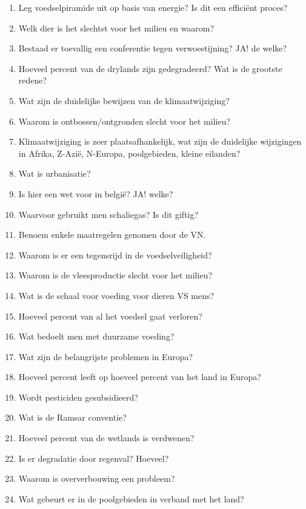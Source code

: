 \documentclass[a4paper,12pt]{article}
\begin{document}
\begin{enumerate}
        \item Leg voedselpiramide uit op basis van energie? Is dit een efficiënt proces?
        \item Welk dier is het slechtst voor het milieu en waarom?
        \item Bestaad er toevallig een conferentie tegen verwoestijning? JA! de welke?
        \item Hoeveel percent van de drylands zijn gedegradeerd? Wat is de grootste redene?
        \item Wat zijn de duidelijke bewijzen van de klimaatwijziging?
        \item Waarom is ontbossen/ontgronden slecht voor het milieu?
        \item Klimaatwijziging is zeer plaatsafhankelijk, wat zijn de duidelijke wijzigingen in Afrika, Z-Azië, N-Europa, poolgebieden, kleine eilanden?
        \item Wat is urbanisatie?
        \item Is hier een wet voor in belgië? JA! welke?
        \item Waarvoor gebruikt men schaliegas? Is dit giftig?
        \item Benoem enkele maatregelen genomen door de VN.
        \item Waarom is er een tegensrijd in de voedselveiligheid?
        \item Waarom is de vleesproductie slecht voor het milieu?
        \item Wat is de schaal voor voeding voor dieren VS mens?
        \item Hoeveel percent van al het voedsel gaat verloren?
        \item Wat bedoelt men met duurzame voeding?
        \item Wat zijn de belangrijste problemen in Europa?
        \item Hoeveel percent leeft op hoeveel percent van het land in Europa?
        \item Wordt pesticiden gesubsidieerd?
        \item Wat is de Ramsar conventie?
        \item Hoeveel percent van de wetlands is verdwenen?
        \item Is er degradatie door regenval? Hoeveel?
        \item Waarom is oververbouwing een probleem?
        \item Wat gebeurt er in de poolgebieden in verband met het land?
    \end{enumerate}
\end{document}
